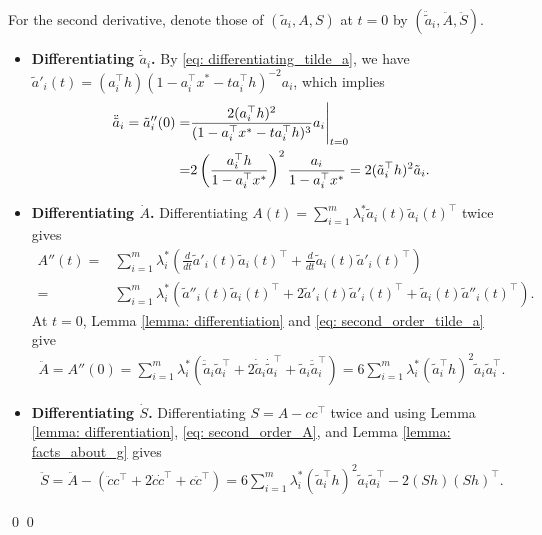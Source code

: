 \documentclass[smallextended]{svjour3}
\let\springerproof\proof
\let\endspringerproof\endproof
\renewenvironment{proof}{\springerproof}{%
  \ifhmode\qed\else\leavevmode\qed\fi\endspringerproof}
\begin{document}
\begin{proof}
    For the second derivative, denote those of $(\tilde{a}_i,A,S)$ at $t=0$ by
    $(\ddot{\tilde{a}}_i,\ddot A,\ddot S)$.
    \begin{itemize}
        \item \textbf{Differentiating $\dot{\tilde{a}}_i$.} By \eqref{eq: differentiating_tilde_a}, we have $\tilde{a}'_i(t) = (a_i^\top h)(1 - a_i^\top x^*-t a_i^\top h)^{-2} a_i$, which implies
        \begin{align}\label{eq: second_order_tilde_a}
        \ddot{\tilde{a}}_i= \tilde{a}''_i(0) =  & \frac{2(a_i^\top h)^2}{(1-a_i^\top x^* - ta_i^\top h)^3} a_i \Bigg|_{t=0} \notag \\
        = & 2\left(\frac{a_i^\top h}{1-a_i^\top x^*}\right)^2 \frac{a_i}{1-a_i^\top x^*} = 2(\tilde{a}_i^\top h)^2 \tilde{a}_i.
        \end{align}
        \item \textbf{Differentiating $\dot{A}$.} Differentiating
        $A(t)=\sum_{i=1}^m\lambda_i^*\tilde a_i(t)\tilde a_i(t)^\top$ twice gives
        \begin{align*}
            A''(t) = & \sum_{i=1}^m \lambda_i^*\left(\frac{d}{dt} \tilde{a}'_i(t)\tilde{a}_i(t)^\top + \frac{d}{dt}\tilde{a}_i(t) \tilde{a}'_i(t)^\top \right) \\
            = &  \sum_{i=1}^m \lambda_i^*\left(\tilde{a}''_i(t) \tilde{a}_i(t)^\top + 2\tilde{a}'_i(t)\tilde{a}'_i(t)^\top + \tilde{a}_i(t)\tilde{a}''_i(t)^\top  \right).
        \end{align*}
        At $t=0$, Lemma \ref{lemma: differentiation} and
        \eqref{eq: second_order_tilde_a} give
        \begin{align}\label{eq: second_order_A}
            \ddot{A} = A''(0) =\sum_{i=1}^m \lambda_i^* \left(\ddot{\tilde{a}}_i \tilde{a}_i^\top + 2 \dot{\tilde{a}}_i\dot{\tilde{a}}_i^\top + \tilde{a}_i \ddot{\tilde{a}}_i^\top \right) =  6 \sum_{i=1}^m \lambda_i^* (\tilde{a}_i^\top h)^2 \tilde{a}_i \tilde{a}_i^\top.
        \end{align}
        \item \textbf{Differentiating $\dot{S}$.} Differentiating
        $S=A-cc^\top$ twice and using Lemma \ref{lemma: differentiation},
        \eqref{eq: second_order_A}, and Lemma \ref{lemma: facts_about_g} gives
        \begin{align}
            \ddot{S} = \ddot{A} - (\ddot{c}c^\top + 2\dot{c}\dot{c}^\top + c\ddot{c}^\top) =  6 \sum_{i=1}^m \lambda_i^* (\tilde{a}_i^\top h)^2 \tilde{a}_i \tilde{a}_i^\top - 2(Sh)(Sh)^\top.\label{eq: second_order_S}

\end{align}
\end{itemize}
\end{proof}
\end{document}
